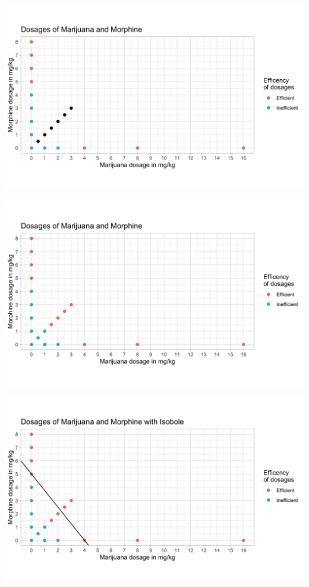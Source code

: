 \documentclass[14pt]{beamer}
\begin{document}
\begin{frame}
\begin{center}
\includegraphics[scale=0.24]{img6.png}
\end{center}
\end{frame}

\begin{frame}
\begin{center}
\includegraphics[scale=0.24]{img7.png}
\end{center}
\end{frame}

\begin{frame}
\begin{center}
\includegraphics[scale=0.24]{img8.png}
\end{center}
\end{frame}
\end{document}
